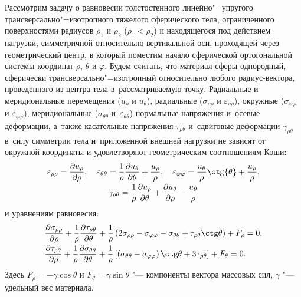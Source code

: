  Рассмотрим задачу о равновесии толстостенного линейно"=упругого трансверсально"=изотропного тяжёлого сферического тела, ограниченного поверхностями радиусов $\rho_1$ и $\rho_2$ \linebreak \mbox{($\rho_1 <\rho_2$)} и находящегося под действием нагрузки, симметричной относительно вертикальной оси, проходящей через геометрический центр, в который поместим начало сферической ортогональной системы координат $\rho$, $\theta $ и $\varphi$. 
Будем считать, что материал сферы однородный, сферически трансверсально"=изотропный относительно любого радиус-вектора, проведенного из центра тела в~рассматриваемую точку. 
Радиальные и меридиональные перемещения ($u_\rho$ и $u_\theta$), радиальные ($\sigma _{\rho \rho}$ и $\varepsilon _{\rho \rho}$), окружные ($\sigma _{\varphi \varphi}$ и $\varepsilon _{\varphi \varphi}$), меридиональные ($\sigma_{\theta \theta}$ и~$\varepsilon _{\theta \theta }$) нормальные напряжения и~осевые деформации, а~также касательные напряжения $\tau _{\rho \theta }$ и~сдвиговые деформации $\gamma _{\rho \theta}$ в~силу симметрии тела и~приложенной внешней нагрузки не зависят от окружной координаты и удовлетворяют геометрическим соотношениям Коши:
\begin{equation}
\label{zai:eq1} 
\begin{array}{c}
\displaystyle
\varepsilon _{\rho \rho} = \frac{\partial u_\rho
}{\partial \rho}, \quad \varepsilon _{\theta \theta } =
\frac{1}{\rho}\frac{\partial u_\theta}{\partial \theta} +
\frac{u_\rho}{\rho}, \quad \varepsilon _{\varphi \varphi} =
\frac{u_\theta}{\rho} \ctg {\theta} + \frac{u_\rho }{\rho}, \vspace{1mm}
\\
\displaystyle
\gamma _{\rho \theta } = \frac{1}{\rho }\frac{\partial u_\rho
}{\partial \theta } + \frac{\partial u_\theta }{\partial \rho } -
\frac{u_\theta }{\rho }
\end{array}
\end{equation}
\noindent и уравнениям равновесия:
\begin{equation}
\label{zai:eq2} 
\begin{array}{l}
\displaystyle
\frac{\partial \sigma _{\rho \rho } }{\partial \rho } +
\frac{1}{\rho }\frac{\partial \tau _{\rho \theta } }{\partial \theta
} + \frac{1}{\rho }\left( {2\sigma _{\rho \rho } - \sigma _{\varphi
\varphi } - \sigma _{\theta \theta } + \tau _{\rho \theta } \ctg
\theta } \right) + F_\rho = 0, \vspace{1mm}
\\
\displaystyle
\frac{\partial \tau _{\rho \theta } }{\partial \rho } +
\frac{1}{\rho }\frac{\partial \sigma _{\theta \theta } }{\partial
\theta } + \frac{1}{\rho }\left[ {\left( {\sigma _{\theta \theta } -
\sigma _{\varphi \varphi } } \right) \ctg \theta + 3\tau _{\rho
\theta } } \right] + F_\theta = 0.
\end{array}
\end{equation}
\noindent Здесь $F_\rho = - \gamma \cos \theta $ и $F_\theta =
\gamma \sin \theta $ "--- компоненты вектора массовых сил, $\gamma $
"--- удельный вес материала.

